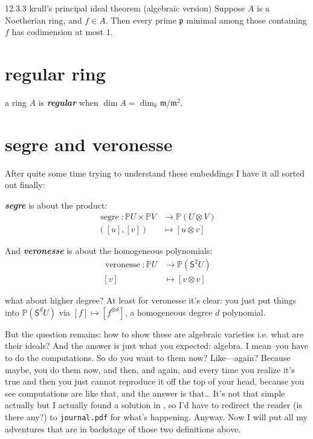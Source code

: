 \begin{thing6}{12.3.3 \cite{sea} krull's principal ideal theorem (algebraic version)}\leavevmode
Suppose \(A\) is a Noetherian ring, and \(f \in A\). Then every prime \(\mathfrak{p}\) minimal among those containing \(f\) has codimension at most \(1\).
\end{thing6}


\section{regular ring}

a ring \(A\) is \textit{\textbf{regular}} when \(\dim A= \dim_k \mathfrak{m}/\mathfrak{m}^2\).

\section{segre and veronesse}

After quite some time trying to understand these embeddings I have it all sorted out finally:

\textit{\textbf{segre}} is about the product:
\begin{align*}
	\operatorname{s e g re}: \mathbb{P}U \times \mathbb{P}V &\longrightarrow \mathbb{P}(U \otimes V) \\
	([u],[v])&\longmapsto [u \otimes v]
\end{align*}

And \textit{\textbf{veronesse}} is about the homogeneous polynomials:
\begin{align*}
	\operatorname{ver o ne sse}: \mathbb{P}U &\longrightarrow \mathbb{P}(\mathsf{S}^2U) \\
	[v]&\longmapsto [v \otimes v]
\end{align*}

what about higher degree? At least for veronesse it's clear: you just put things into \(\mathbb{P}(\mathsf{S}^dU)\) via \([f] \mapsto [f^{\otimes d}]\), a homogeneous degree \(d\) polynomial.

But the question remains: how to show these are algebraic varieties i.e. what are their ideals? And the answer is just what you expected: algebra. I mean--you have to do the computations. So do you want to them now? Like---again? Because maybe, you do them now, and then, and again, and every time you realize it's true and then you just cannot reproduce it off the top of your head, because you see computations are like that, and the answer is that… It's not that simple actually but I actually found a solution in \cite{sysy}, so I'd have to redirect the reader (is there any?) to \texttt{journal.pdf} for what's happening. Anyway. Now I will put all my adventures that are in backstage of those two definitions above.
